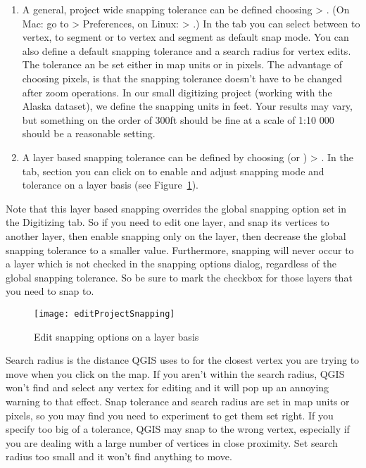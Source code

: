 \begin{enumerate}
\item A general, project wide snapping tolerance can be defined choosing
 > . 
(On Mac: go to   > Preferences, on Linux:  > .)
In the  tab you can select between to vertex, to segment or
to vertex and segment as default snap mode. You can also define a default
snapping tolerance and a search radius for vertex edits. The tolerance an be 
set either in map units or in pixels. The advantage of choosing pixels, is 
that the snapping tolerance doesn't have to be changed after zoom operations. 
In our small digitizing project (working with the Alaska dataset), we define 
the snapping units in feet. Your results may vary, but something on the order 
of 300ft should be fine at a scale of 1:10 000 should be a reasonable 
setting.
\item A layer based snapping tolerance can be defined by choosing
 (or ) > . In the  tab, section  you
can click on  to enable and adjust snapping
mode and tolerance on a layer basis (see Figure~\ref{fig:snappingoptions}).
\end{enumerate}
Note that this layer based snapping overrides the global snapping option set in the Digitizing tab. So if you need to edit one layer, and snap its vertices to another layer, then enable snapping only on the  layer, then decrease the global snapping tolerance to a smaller value.  Furthermore, snapping will never occur to a layer which is not checked in the snapping options dialog, regardless of the global snapping tolerance. So be sure to mark the checkbox for those layers that you need to snap to.

\begin{figure}[ht]
   \centering
   \caption{Edit snapping options on a layer basis \nixcaption}\label{fig:snappingoptions}
   \texttt{[image: editProjectSnapping]} 
 \end{figure}


Search radius is the distance QGIS uses to  for the closest
vertex you are trying to move when you click on the
map. If you aren't within the search radius, QGIS won't find and select
any vertex for editing and it will pop up an annoying warning to that effect.
Snap tolerance and search radius are set in map units or pixels, so you may find you
need to experiment to get them set right. If you specify too big of a
tolerance, QGIS may snap to the wrong vertex, especially if you are dealing
with a large number of vertices in close proximity. Set search radius too
small and it won't find anything to move.

